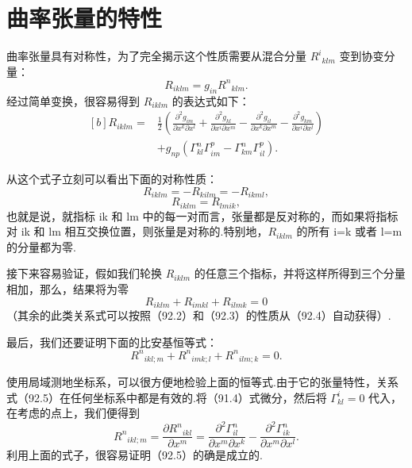 \section{曲率张量的特性}

曲率张量具有对称性，为了完全揭示这个性质需要从混合分量 $R^i{}_{klm}$ 变到协变分量：
\begin{equation*}
  R_{iklm}=g_{in}R^n{}_{klm}.
\end{equation*}
经过简单变换，很容易得到 $R_{iklm}$ 的表达式如下：
\begin{equation}
\begin{aligned}[b]
  R_{iklm}={}&\frac{1}{2}\left(\frac{\partial^2 g_{im}}{\partial x^k\partial x^l}
  +\frac{\partial^2 g_{kl}}{\partial x^i\partial x^m}
  -\frac{\partial^2 g_{il}}{\partial x^k\partial x^m}
  -\frac{\partial^2 g_{km}}{\partial x^i\partial x^l}\right)\\
  &+g_{np}\left(\Gamma^n_{kl}\Gamma^p_{im}
  -\Gamma^n_{km}\Gamma^p_{il}\right).
\end{aligned}
\end{equation}

从这个式子立刻可以看出下面的对称性质：
\begin{equation}
  R_{iklm}=-R_{kilm}=-R_{ikml},
\end{equation}
\begin{equation}
  R_{iklm}=R_{lmik},
\end{equation}
也就是说，就指标 ik 和 lm 中的每一对而言，张量都是反对称的，而如果将指标对 ik 和 lm 相互交换位置，则张量是对称的.特别地，$R_{iklm}$ 的所有 i=k 或者 l=m 的分量都为零.

接下来容易验证，假如我们轮换 $R_{iklm}$ 的任意三个指标，并将这样所得到三个分量相加，那么，结果将为零
\begin{equation}
  R_{iklm}+R_{imkl}+R_{ilmk}=0
\end{equation}
（其余的此类关系式可以按照（92.2）和（92.3）的性质从（92.4）自动获得）.

最后，我们还要证明下面的比安基恒等式：
\begin{equation}
  R^n{}_{ikl;m}+R^n{}_{imk;l}+R^n{}_{ilm;k}=0.
\end{equation}

使用局域测地坐标系，可以很方便地检验上面的恒等式.由于它的张量特性，关系式（92.5）在任何坐标系中都是有效的.将（91.4）式微分，然后将 $\Gamma^i_{kl}=0$ 代入，在考虑的点上，我们便得到
\begin{equation*}
  R^n{}_{ikl;m}=\frac{\partial R^n{}_{ikl}}{\partial x^m}
  =\frac{\partial^2\Gamma^n_{il}}{\partial x^m\partial x^k}
  -\frac{\partial^2\Gamma^n_{ik}}{\partial x^m\partial x^l}.
\end{equation*}
利用上面的式子，很容易证明（92.5）的确是成立的.

